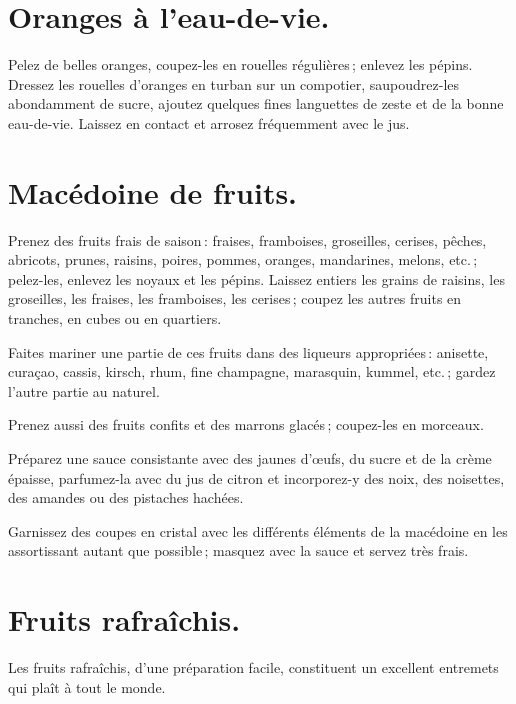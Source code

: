 \section*{\centering Oranges à l’eau-de-vie.}
{}

Pelez de belles oranges, coupez-les en rouelles régulières ; enlevez les
pépins. Dressez les rouelles d'oranges en turban sur un compotier,
saupoudrez-les abondamment de sucre, ajoutez quelques fines languettes de zeste
et de la bonne eau-de-vie. Laissez en contact et arrosez fréquemment avec le
jus.

\section*{\centering Macédoine de fruits.}
{}

Prenez des fruits frais de saison : fraises, framboises, groseilles, cerises,
pêches, abricots, prunes, raisins, poires, pommes, oranges, mandarines, melons,
etc. ; pelez-les, enlevez les noyaux et les pépins. Laissez entiers les grains
de raisins, les groseilles, les fraises, les framboises, les cerises ; coupez
les autres fruits en tranches, en cubes ou en quartiers.

Faites mariner une partie de ces fruits dans des liqueurs appropriées :
anisette, curaçao, cassis, kirsch, rhum, fine champagne, marasquin, kummel,
etc. ; gardez l’autre partie au naturel.

Prenez aussi des fruits confits et des marrons glacés ; coupez-les en morceaux.

Préparez une sauce consistante avec des jaunes d'œufs, du sucre et de la crème
épaisse, parfumez-la avec du jus de citron et incorporez-y des noix, des noisettes,
des amandes ou des pistaches hachées.

Garnissez des coupes en cristal avec les différents éléments de la macédoine en
les assortissant autant que possible ; masquez avec la sauce et servez très
frais.

\section*{\centering Fruits rafraîchis.}
{}

Les fruits rafraîchis, d’une préparation facile, constituent un excellent
entremets qui plaît à tout le monde.

